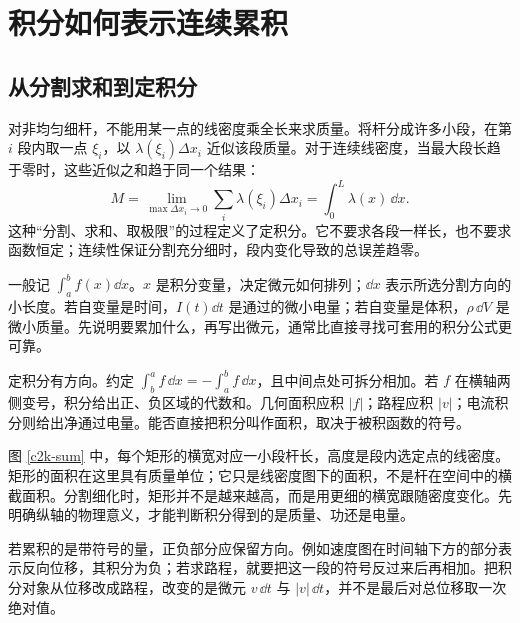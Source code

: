 \section{积分如何表示连续累积}
\subsection{从分割求和到定积分}
对非均匀细杆，不能用某一点的线密度乘全长来求质量。将杆分成许多小段，在第 $i$ 段内取一点 $\xi_i$，以 $\lambda(\xi_i)\Delta x_i$ 近似该段质量。对于连续线密度，当最大段长趋于零时，这些近似之和趋于同一个结果：
\[
 M=\lim_{\max\Delta x_i\to0}\sum_i\lambda(\xi_i)\Delta x_i
 =\int_0^L\lambda(x)\,\dd x.
\]
这种“分割、求和、取极限”的过程定义了定积分。它不要求各段一样长，也不要求函数恒定；连续性保证分割充分细时，段内变化导致的总误差趋零。

一般记 $\int_a^b f(x)\dd x$。$x$ 是积分变量，决定微元如何排列；$\dd x$ 表示所选分割方向的小长度。若自变量是时间，$I(t)\dd t$ 是通过的微小电量；若自变量是体积，$\rho\,\dd V$ 是微小质量。先说明要累加什么，再写出微元，通常比直接寻找可套用的积分公式更可靠。

定积分有方向。约定 $\int_b^a f\,\dd x=-\int_a^b f\,\dd x$，且中间点处可拆分相加。若 $f$ 在横轴两侧变号，积分给出正、负区域的代数和。几何面积应积 $|f|$；路程应积 $|v|$；电流积分则给出净通过电量。能否直接把积分叫作面积，取决于被积函数的符号。

图 \ref{c2k-sum} 中，每个矩形的横宽对应一小段杆长，高度是段内选定点的线密度。矩形的面积在这里具有质量单位；它只是线密度图下的面积，不是杆在空间中的横截面积。分割细化时，矩形并不是越来越高，而是用更细的横宽跟随密度变化。先明确纵轴的物理意义，才能判断积分得到的是质量、功还是电量。

若累积的是带符号的量，正负部分应保留方向。例如速度图在时间轴下方的部分表示反向位移，其积分为负；若求路程，就要把这一段的符号反过来后再相加。把积分对象从位移改成路程，改变的是微元 $v\,\dd t$ 与 $|v|\,\dd t$，并不是最后对总位移取一次绝对值。


